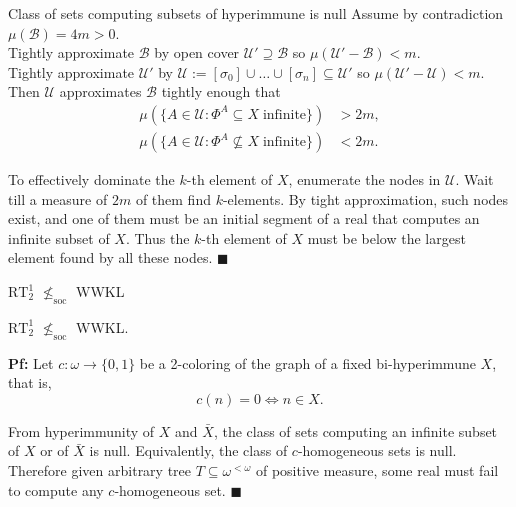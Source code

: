 \begin{frame}{Class of sets computing subsets of hyperimmune is null}
  Assume by contradiction $\mu(\mathcal{B})=4m>0$.\\
  Tightly approximate $\mathcal{B}$ by open cover
  $\mathcal{U}'\supseteq\mathcal{B}$ so
  $\mu(\mathcal{U}'-\mathcal{B})<m$.\\
  Tightly approximate $\mathcal{U}'$ by $\mathcal{U} :=[\sigma_0] \cup
  \ldots\cup[\sigma_n] \subseteq\mathcal{U}'$ so
  $\mu(\mathcal{U}'-\mathcal{U}) <m$.\\
  Then $\mathcal{U}$ approximates $\mathcal{B}$ tightly enough that
  \begin{align*}
    \mu(\{A\in\mathcal{U}: \Phi^A \subseteq X\; \text{infinite}\}) &>2m,\\
    \mu(\{A\in\mathcal{U}: \Phi^A \not\subseteq X\; \text{infinite}\}) &<2m.
  \end{align*}

  To effectively dominate the $k$-th element of $X$, enumerate the nodes in
  $\mathcal{U}$. Wait till a measure of $2m$ of them find $k$-elements. By
  tight approximation, such nodes exist, and one of them must be an initial
  segment of a real that computes an infinite subset of $X$. Thus the
  $k$-th element of $X$ must be below the largest element found by all
  these nodes. $\blacksquare$
\end{frame}

\begin{frame}{$\text{RT}_2^1$ $\nleq_{\text{soc}}$ WWKL}
  \begin{thm}
    $\text{RT}_2^1$ $\nleq_{\text{soc}}$ WWKL.
  \end{thm}

  \vspace{1em}
  \textbf{Pf:} Let $c:\omega\rightarrow\{0,1\}$ be a 2-coloring of the
  graph of a fixed bi-hyperimmune $X$, that is,
  \[c(n)=0 \Leftrightarrow n\in X.\]
  
  From hyperimmunity of $X$ and $\bar{X}$, the class of sets computing an
  infinite subset of $X$ or of $\bar{X}$ is null. Equivalently, the class
  of $c$-homogeneous sets is null. Therefore given arbitrary tree
  $T\subseteq\omega^{<\omega}$ of positive measure, some real must fail to
  compute any $c$-homogeneous set. $\blacksquare$
\end{frame}

